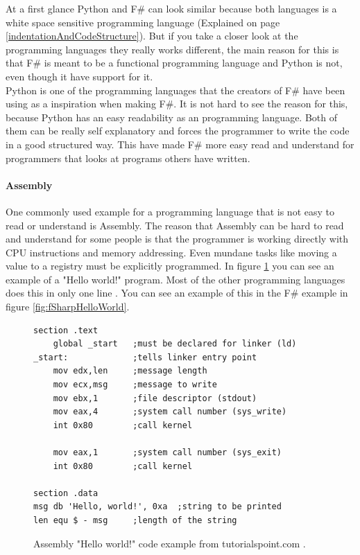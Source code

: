 \documentclass[12pt, a4paper]{article}
\begin{document}
At a first glance Python and F\# can look similar because both languages is a white space sensitive programming language (Explained on page \ref{indentationAndCodeStructure}). But if you take a closer look at the programming languages they really works different, the main reason for this is that F\# is meant to be a functional programming language and Python is not, even though it have support for it.\\

Python is one of the programming languages that the creators of F\# have been using as a inspiration when making F\#. It is not hard to see the reason for this, because Python has an easy readability as an programming language. Both of them can be really self explanatory and forces the programmer to  write the code in a good structured way. This have made F\# more easy read and understand for programmers that looks at programs others have written.

\newpage
\paragraph{Assembly} One commonly used example for a programming language that is not easy to read or understand is Assembly. The reason that Assembly can be hard to read and understand for some people is that the programmer is working directly with CPU instructions and memory addressing. Even mundane tasks like moving a value to a registry must be explicitly programmed. In figure \ref{fig:assemblyExample} you can see an example of a "Hello world!" program. Most of the other programming languages does this in only one line . You can see an example of this in the F\# example in figure \ref{fig:fSharpHelloWorld}.\\

\begin{figure}[!h]
	\begin{lstlisting}
section	.text
    global _start   ;must be declared for linker (ld)
_start:	            ;tells linker entry point
    mov	edx,len     ;message length
    mov	ecx,msg     ;message to write
    mov	ebx,1       ;file descriptor (stdout)
    mov	eax,4       ;system call number (sys_write)
    int	0x80        ;call kernel
	
    mov	eax,1       ;system call number (sys_exit)
    int	0x80        ;call kernel

section	.data
msg db 'Hello, world!', 0xa  ;string to be printed
len equ $ - msg     ;length of the string
	\end{lstlisting}
	\caption{Assembly "Hello world!" code example from tutorialspoint.com \cite{tutorialspoint}.}
	\label{fig:assemblyExample}
\end{figure}
\end{document}
